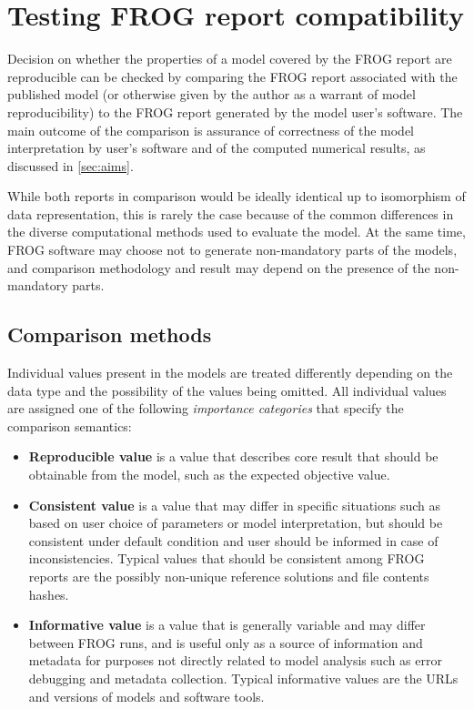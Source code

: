 \chapter{Testing FROG report compatibility}
\label{chap:test}

Decision on whether the properties of a model covered by the FROG report are reproducible can be checked by comparing the FROG report associated with the published model (or otherwise given by the author as a warrant of model reproducibility) to the FROG report generated by the model user's software. The main outcome of the comparison is assurance of correctness of the model interpretation by user's software and of the computed numerical results, as discussed in \cref{sec:aims}.

While both reports in comparison would be ideally identical up to isomorphism of data representation, this is rarely the case because of the common differences in the diverse computational methods used to evaluate the model. At the same time, FROG software may choose not to generate non-mandatory parts of the models, and comparison methodology and result may depend on the presence of the non-mandatory parts.

\section{Comparison methods}

Individual values present in the models are treated differently depending on the data type and the possibility of the values being omitted. All individual values are assigned one of the following \emph{importance categories} that specify the comparison semantics:
\begin{itemize}
\item \textbf{Reproducible value} is a value that describes core result that should be obtainable from the model, such as the expected objective value.
\item \textbf{Consistent value} is a value that may differ in specific situations such as based on user choice of parameters or model interpretation, but should be consistent under default condition and user should be informed in case of inconsistencies. Typical values that should be consistent among FROG reports are the possibly non-unique reference solutions and file contents hashes.
\item \textbf{Informative value} is a value that is generally variable and may differ between FROG runs, and is useful only as a source of information and metadata for purposes not directly related to model analysis such as error debugging and metadata collection. Typical informative values are the URLs and versions of models and software tools.
\end{itemize}

